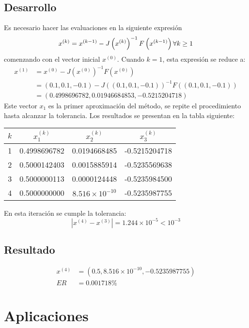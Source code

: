 \begin{exerciseT}
\subsection*{Desarrollo}
Es necesario hacer las evaluaciones en la siguiente expresión 
\[ 
	x^{(k)} = x^{(k-1)} - J\left(x^{(k)}\right)^{-1}F\left(x^{(k-1)} \right)\\
	\forall k\geq 1
\]
comenzando con el vector inicial $x^{(0)}$. Cuando $k=1$, esta expresión se reduce a:
\begin{align*}
	x^{(1)} &= x^{(0)} - J\left(x^{(0)}\right)^{-1}F\left(x^{(0)} \right)\\
		&= (0.1, 0.1, -0.1) - J\left((0.1, 0.1, -0.1)\right)^{-1}F\left((0.1, 0.1, -0.1) \right)\\
		&= (0.4998696782, 0.01946684853, -0.5215204718)
\end{align*}
Este vector $x_1$ es la primer aproximación del método, se repite el procedimiento hasta alcanzar la tolerancia.
Los resultados se presentan en la tabla siguiente:
\begin{table}[H]
	\centering
	\begin{tabular}{cccc}
		\toprule
		$k$ & $x_1^{(k)}$ & $x_2^{(k)}$ & $x_3^{(k)}$ \\
		\midrule
		1 & 0.4998696782 & 0.0194668485 & -0.5215204718 \\
		2 & 0.5000142403 & 0.0015885914 & -0.5235569638 \\
		3 & 0.5000000113 & 0.0000124448 & -0.5235984500 \\
		4 & 0.5000000000 & $8.516\times 10^{-10}$ & -0.5235987755\\
		\bottomrule	
	\end{tabular}
\end{table}
En esta iteración se cumple la tolerancia:
\[ |x^{(4)} - x^{(3)}| = 1.244\times 10^{-5} < 10^{-3}\]

\subsection*{Resultado}
\begin{align*}
	x^{(4)} &= (0.5, 8.516\times 10^{-10}, -0.5235987755) \\
	ER &= 0.001718\%
\end{align*}

\end{exerciseT}


\section{Aplicaciones}
